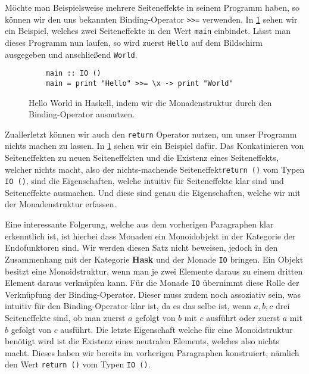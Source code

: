 \documentclass{hhuarticle}
\theoremstyle{definition}
\theoremstyle{theorem}
\begin{document}
  Möchte man Beispielsweise mehrere Seiteneffekte in seinem Programm
  haben, so können wir den uns bekannten Binding-Operator \verb|>>=|
  verwenden. In \cref{fig:ioexamples} sehen wir ein Beispiel, welches zwei
  Seiteneffekte in den Wert \verb|main| einbindet. Lässt man dieses
  Programm nun laufen, so wird zuerst \verb|Hello| auf dem Bildschirm
  ausgegeben und anschließend \verb|World|.
  
  \begin{figure}[h]
    \begin{verbatim}
    main :: IO ()
    main = print "Hello" >>= \x -> print "World"
    \end{verbatim}
    \caption{Hello World in Haskell, indem wir die Monadenstruktur durch den Binding-Operator ausnutzen.}%
    \label{fig:ioexamples}
  \end{figure}

  Zuallerletzt können wir auch den \verb|return| Operator nutzen, um
  unser Programm nichts machen zu lassen. In \cref{fig:ioexamples} sehen
  wir ein Beispiel dafür. Das Konkatinieren von Seiteneffekten 
  zu neuen Seiteneffekten und die Existenz eines Seiteneffekts,
  welcher nichts macht, also der \glqq nichts-machende Seiteneffekt\glqq  \verb|return ()|
  vom Typen \verb|IO ()|, sind die Eigenschaften, welche
  intuitiv für Seiteneffekte klar sind und Seiteneffekte ausmachen.
  Und diese sind genau die Eigenschaften, welche wir mit der Monadenstruktur
  erfassen.

  Eine interessante Folgerung, welche aus dem vorherigen Paragraphen
  klar erkenntlich ist, ist hierbei dass Monaden ein Monoidobjekt
  in der Kategorie der Endofunktoren sind. Wir werden diesen Satz nicht
  beweisen, jedoch in den Zusammenhang mit der Kategorie \textbf{Hask}
  und der Monade \verb|IO| bringen.
  Ein Objekt besitzt eine Monoidstruktur,
  wenn man je zwei Elemente daraus zu einem dritten Element daraus
  verknüpfen kann.
  Für die Monade \verb|IO| übernimmt diese Rolle der Verknüpfung der Binding-Operator.
  Dieser muss zudem noch assoziativ sein, was intuitiv für den Binding-Operator
  klar ist, da es das selbe ist, wenn $a, b, c$ drei Seiteneffekte sind,
  ob man zuerst $a$ gefolgt von $b$ mit $c$ ausführt oder zuerst $a$ mit $b$
  gefolgt von $c$ ausführt. Die letzte Eigenschaft welche für eine Monoidstruktur
  benötigt wird ist die Existenz eines neutralen Elements, welches
  also nichts macht. Dieses haben wir bereits im vorherigen Paragraphen
  konstruiert, nämlich den Wert \verb|return ()| vom Typen \verb|IO ()|.
\end{document}
